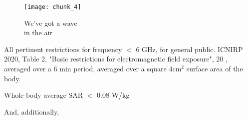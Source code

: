 \documentclass[fleqn,10pt]{article}
\begin{document}
\clearpage

\begin{figure}[H]
	\captionsetup{singlelinecheck = false, justification=justified}
	\centering
	\texttt{[image: chunk\_4]}
	\caption{
		We've got a wave\\
		in the air}
\end{figure}





%

All pertinent restrictions for frequency $<$ 6 GHz, for general public.
ICNIRP 2020, Table 2, "Basic restrictions for electromagnetic field exposure",
20 \Wsqm, averaged over a 6 min period, averaged over a square $4 \text{cm}^2$ surface area of the body.

Whole-body average SAR $<$ 0.08 W/kg

And, additionally, 
\end{document}
